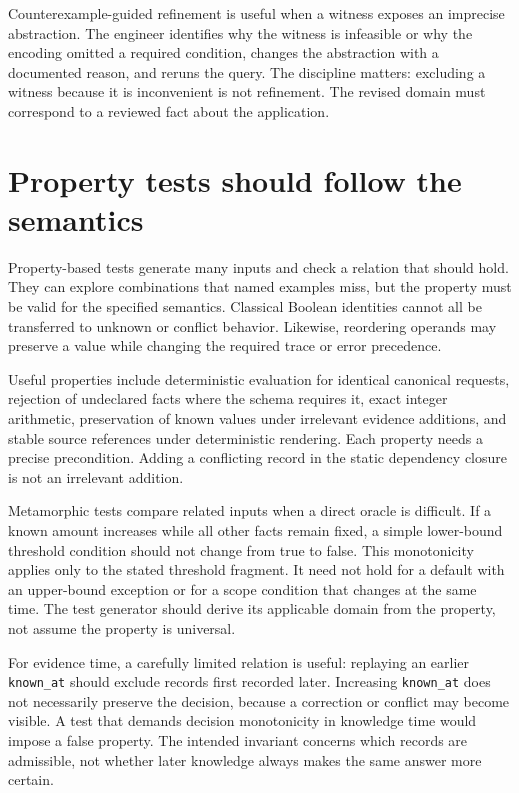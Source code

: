 Counterexample-guided refinement is useful when a witness exposes an imprecise
abstraction. The engineer identifies why the witness is infeasible or why the
encoding omitted a required condition, changes the abstraction with a documented
reason, and reruns the query. The discipline matters: excluding a witness because
it is inconvenient is not refinement. The revised domain must correspond to a
reviewed fact about the application.

\section{Property tests should follow the semantics}
\label{merge:M07:08}


Property-based tests generate many inputs and check a relation that should hold.
They can explore combinations that named examples miss, but the property must
be valid for the specified semantics. Classical Boolean identities cannot all be
transferred to unknown or conflict behavior. Likewise, reordering operands may
preserve a value while changing the required trace or error precedence.

Useful properties include deterministic evaluation for identical canonical
requests, rejection of undeclared facts where the schema requires it, exact
integer arithmetic, preservation of known values under irrelevant evidence
additions, and stable source references under deterministic rendering. Each
property needs a precise precondition. Adding a conflicting record in the static
dependency closure is not an irrelevant addition.


Metamorphic tests compare related inputs when a direct oracle is difficult. If a
known amount increases while all other facts remain fixed, a simple lower-bound
threshold condition should not change from true to false. This monotonicity
applies only to the stated threshold fragment. It need not hold for a default
with an upper-bound exception or for a scope condition that changes at the same
time. The test generator should derive its applicable domain from the property,
not assume the property is universal.

For evidence time, a carefully limited relation is useful: replaying an earlier
\texttt{known\_at} should exclude records first recorded later. Increasing
\texttt{known\_at} does not necessarily preserve the decision, because a correction
or conflict may become visible. A test that demands decision monotonicity in
knowledge time would impose a false property. The intended invariant concerns
which records are admissible, not whether later knowledge always makes the same
answer more certain.

